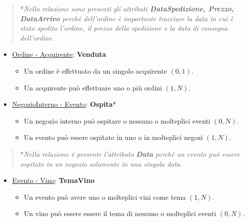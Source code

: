 \begin{verse}
	*\emph{Nella relazione sono presenti gli attributi \textbf{DataSpedizione, Prezzo, DataArrivo} perchè dell'ordine è importante tracciare la data in cui è stato spedito l'ordine, il prezzo della spedizione e la data di consegna dell'ordine.}
\end{verse}

\begin{itemize}
	\item \underline{Ordine - Acquirente}: \textbf{Venduta}
	
	\begin{itemize}
		\item Un ordine è effettuato da un singolo acquirente $(0,1)$.
		\item Un acquirente può effettuare uno o più ordini $(1,N)$.
	\end{itemize}
	
\end{itemize}

\begin{itemize}
	\item \underline{NegozioInterno - Evento}: \textbf{Ospita}*
	
	\begin{itemize}
		\item Un negozio interno può ospitare o nessuno o molteplici eventi $(0,N)$.
		\item Un evento può essere ospitato in uno o in molteplici negozi $(1,N)$.
	\end{itemize}
	
\end{itemize}

\begin{verse}
	*\emph{Nella relazione è presente l'attributo \textbf{Data} perchè un evento può essere ospitato in un negozio solamente in una singola data.}
\end{verse}


\begin{itemize}
	\item \underline{Evento - Vino}: \textbf{TemaVino}
	
	\begin{itemize}
		\item Un evento può avere uno o molteplici vini come tema $(1,N)$.
		\item Un vino può essere essere il tema di nessuno o molteplici eventi $(0,N)$.
	\end{itemize}
	
\end{itemize}

